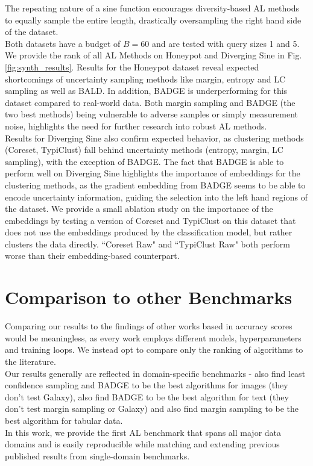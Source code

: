 \documentclass[]{article}
\begin{document}
The repeating nature of a sine function encourages diversity-based AL methods to equally sample the entire length, drastically oversampling the right hand side of the dataset. \\
Both datasets have a budget of $B=60$ and are tested with query sizes 1 and 5. \\[1mm]
%
We provide the rank of all AL Methods on Honeypot and Diverging Sine in Fig. \ref{fig:synth_results}.
Results for the Honeypot dataset reveal expected shortcomings of uncertainty sampling methods like margin, entropy and LC sampling as well as BALD.
In addition, BADGE is underperforming for this dataset compared to real-world data. 
Both margin sampling and BADGE (the two best methods) being vulnerable to adverse samples or simply measurement noise, highlights the need for further research into robust AL methods. \\
%
Results for Diverging Sine also confirm expected behavior, as clustering methods (Coreset, TypiClust) fall behind uncertainty methods (entropy, margin, LC sampling), with the exception of BADGE. 
The fact that BADGE is able to perform well on Diverging Sine highlights the importance of embeddings for the clustering methods, as the gradient embedding from BADGE seems to be able to encode uncertainty information, guiding the selection into the left hand regions of the dataset. 
We provide a small ablation study on the importance of the embeddings by testing a version of Coreset and TypiClust on this dataset that does not use the embeddings produced by the classification model, but rather clusters the data directly.
``Coreset Raw" and ``TypiClust Raw" both perform worse than their embedding-based counterpart.


\section{Comparison to other Benchmarks}
Comparing our results to the findings of other works based in accuracy scores would be meaningless, as every work employs different models, hyperparameters and training loops.
We instead opt to compare only the ranking of algorithms to the literature. \\
Our results generally are reflected in domain-specific benchmarks - \cite{zhang2024labelbench} also find least confidence sampling and BADGE to be the best algorithms for images (they don't test Galaxy), \cite{rauch2023activeglae} also find BADGE to be the best algorithm for text (they don't test margin sampling or Galaxy) and \cite{bahri2024is} also find margin sampling to be the best algorithm for tabular data. \\
In this work, we provide the first AL benchmark that spans all major data domains and is easily reproducible while matching and extending previous published results from single-domain benchmarks. 
\end{document}
